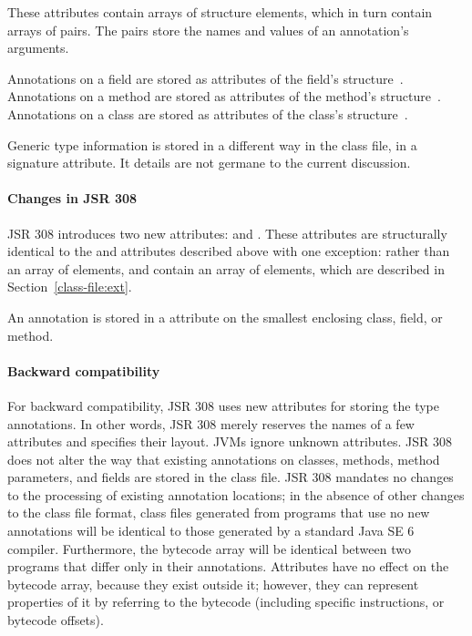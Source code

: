 \documentclass[10pt]{article}
\begin{document}
These attributes contain arrays of
 structure elements, which in turn contain arrays of
 pairs.  The  pairs store
the names and values of an annotation's arguments.

Annotations on a field are stored as attributes of the field's 
 structure~\cite[\S 4.6]{LindholmY99:CFF5}.
Annotations on a method are stored as attributes of the method's
 structure~\cite[\S 4.7]{LindholmY99:CFF5}.
Annotations on a class are stored as attributes of the class's
 structure~\cite[\S 4.2]{LindholmY99:CFF5}.

Generic type information is stored in a different way in the class file, in
a signature attribute.  It details are not germane to the current
discussion.


\paragraph{Changes in JSR 308}
JSR 308 introduces two new attributes:
\RuntimeVisibleTypeAnnotations and
\RuntimeInvisibleTypeAnnotations. These attributes are
structurally identical to the \RuntimeVisibleAnnotations and
\RuntimeInvisibleAnnotations attributes described above with one
exception: rather than an array of  elements,
\RuntimeVisibleTypeAnnotations and
\RuntimeInvisibleTypeAnnotations contain an array of
\extendedannotation elements, which are described in
Section~\ref{class-file:ext}.


An annotation is stored in a \RuntimeInOrVisibleTypeAnnotations attribute
on the smallest enclosing class, field, or method.


\paragraph{Backward compatibility}
For backward compatibility, JSR 308 uses new attributes for storing
the type annotations.  In other words, JSR 308 merely reserves the
names of a few attributes and specifies their layout.
JVMs ignore unknown
attributes.
JSR 308 does
not alter the way that existing annotations on classes, methods, method parameters,
and fields are stored in the class file.
JSR 308 mandates no changes to the processing of existing annotation locations;
in the absence of other changes to the class file format,
class files generated from programs that use no new
annotations will be identical to those generated by a standard Java SE 6
compiler.
Furthermore, the bytecode array will be identical between two programs that
differ only in their annotations.
Attributes have no effect on the bytecode array, because they exist outside
it; however, they can represent properties of it by referring to the
bytecode (including specific instructions, or bytecode offsets).
\end{document}

